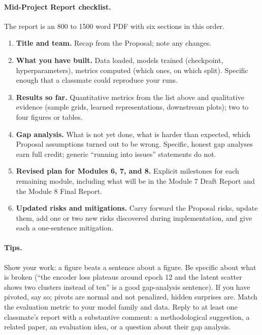\documentclass[11pt]{article}
\theoremstyle{remark}
\begin{document}
\paragraph{Mid-Project Report checklist.}
The report is an 800 to 1500 word PDF with six sections in this order.
\begin{enumerate}[leftmargin=1.5em]
\item \textbf{Title and team.} Recap from the Proposal; note any changes.
\item \textbf{What you have built.} Data loaded, models trained (checkpoint, hyperparameters), metrics computed (which ones, on which split). Specific enough that a classmate could reproduce your runs.
\item \textbf{Results so far.} Quantitative metrics from the list above and qualitative evidence (sample grids, learned representations, downstream plots); two to four figures or tables.
\item \textbf{Gap analysis.} What is not yet done, what is harder than expected, which Proposal assumptions turned out to be wrong. Specific, honest gap analyses earn full credit; generic ``running into issues'' statements do not.
\item \textbf{Revised plan for Modules 6, 7, and 8.} Explicit milestones for each remaining module, including what will be in the Module 7 Draft Report and the Module 8 Final Report.
\item \textbf{Updated risks and mitigations.} Carry forward the Proposal risks, update them, add one or two new risks discovered during implementation, and give each a one-sentence mitigation.
\end{enumerate}

\paragraph{Tips.} Show your work: a figure beats a sentence about a figure. Be specific about what is broken (``the encoder loss plateaus around epoch 12 and the latent scatter shows two clusters instead of ten'' is a good gap-analysis sentence). If you have pivoted, say so; pivots are normal and not penalized, hidden surprises are. Match the evaluation metric to your model family and data. Reply to at least one classmate's report with a substantive comment: a methodological suggestion, a related paper, an evaluation idea, or a question about their gap analysis.

\end{document}
